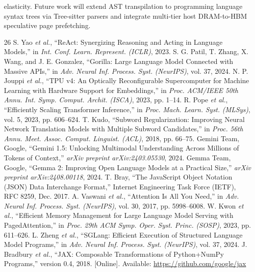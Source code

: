 \documentclass[conference,10pt]{IEEEtran}
\begin{document}
elasticity. Future work will extend AST transpilation to programming language syntax trees via Tree-sitter parsers and integrate multi-tier host DRAM-to-HBM speculative page prefetching.



\begin{thebibliography}{26}
 S. Yao \emph{et al.}, ``ReAct: Synergizing Reasoning and Acting in Language Models,'' in \emph{Int. Conf. Learn. Represent. (ICLR)}, 2023.
 S. G. Patil, T. Zhang, X. Wang, and J. E. Gonzalez, ``Gorilla: Large Language Model Connected with Massive APIs,'' in \emph{Adv. Neural Inf. Process. Syst. (NeurIPS)}, vol. 37, 2024.
 N. P. Jouppi \emph{et al.}, ``TPU v4: An Optically Reconfigurable Supercomputer for Machine Learning with Hardware Support for Embeddings,'' in \emph{Proc. ACM/IEEE 50th Annu. Int. Symp. Comput. Archit. (ISCA)}, 2023, pp. 1--14.
 R. Pope \emph{et al.}, ``Efficiently Scaling Transformer Inference,'' in \emph{Proc. Mach. Learn. Syst. (MLSys)}, vol. 5, 2023, pp. 606--624.
 T. Kudo, ``Subword Regularization: Improving Neural Network Translation Models with Multiple Subword Candidates,'' in \emph{Proc. 56th Annu. Meet. Assoc. Comput. Linguist. (ACL)}, 2018, pp. 66--75.
 Gemini Team, Google, ``Gemini 1.5: Unlocking Multimodal Understanding Across Millions of Tokens of Context,'' \emph{arXiv preprint arXiv:2403.05530}, 2024.
 Gemma Team, Google, ``Gemma 2: Improving Open Language Models at a Practical Size,'' \emph{arXiv preprint arXiv:2408.00118}, 2024.
 T. Bray, ``The JavaScript Object Notation (JSON) Data Interchange Format,'' Internet Engineering Task Force (IETF), RFC 8259, Dec. 2017.
 A. Vaswani \emph{et al.}, ``Attention Is All You Need,'' in \emph{Adv. Neural Inf. Process. Syst. (NeurIPS)}, vol. 30, 2017, pp. 5998--6008.
 W. Kwon \emph{et al.}, ``Efficient Memory Management for Large Language Model Serving with PagedAttention,'' in \emph{Proc. 29th ACM Symp. Oper. Syst. Princ. (SOSP)}, 2023, pp. 611--626.
 L. Zheng \emph{et al.}, ``SGLang: Efficient Execution of Structured Language Model Programs,'' in \emph{Adv. Neural Inf. Process. Syst. (NeurIPS)}, vol. 37, 2024.
 J. Bradbury \emph{et al.}, ``JAX: Composable Transformations of Python+NumPy Programs,'' version 0.4, 2018. [Online]. Available: \url{https://github.com/google/jax}

\end{thebibliography}
\end{document}
